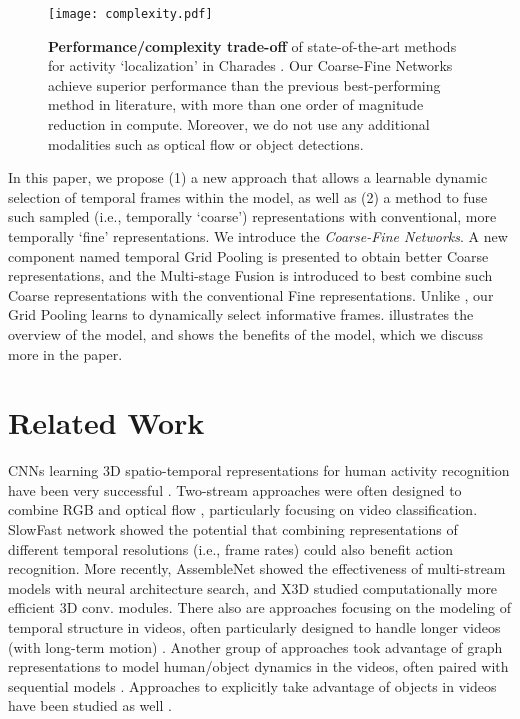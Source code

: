 \documentclass[final]{cvpr}
\begin{document}
\begin{figure}[t]
	\centering
	\texttt{[image: complexity.pdf]}
	\caption{\textbf{Performance/complexity trade-off} of state-of-the-art methods for activity `localization' in Charades \cite{sigurdsson2016hollywood}. Our Coarse-Fine Networks achieve superior performance than the previous best-performing method in literature, with more than one order of magnitude reduction in compute. Moreover, we do not use any additional modalities such as optical flow or object detections.}
	\label{fig:performance_complexity}
	\vspace{-4mm}
\end{figure}

In this paper, we propose (1) a new approach that allows a learnable dynamic selection of temporal frames within the model, as well as (2) a method to fuse such sampled (i.e., temporally `coarse') representations with conventional, more temporally `fine' representations. We introduce the \emph{Coarse-Fine Networks}. A new component named temporal Grid Pooling is presented to obtain better Coarse representations, and the Multi-stage Fusion is introduced to best combine such Coarse representations with the conventional Fine representations. Unlike \cite{feichtenhofer2019slowfast,ryoo2019assemblenet}, our Grid Pooling learns to dynamically select informative frames.
 illustrates the overview of the model, and  shows the benefits of the model, which we discuss more in the paper. \vspace{-2mm}




\section{Related Work}

CNNs learning 3D spatio-temporal representations for human activity recognition have been very successful \cite{tran2014c3d, karpathy2014large,carreira2017quo, tran2017convnet, hara2017learning}. Two-stream approaches were often designed to combine RGB and optical flow \cite{simonyan2014two,feichtenhofer2016convolutional}, particularly focusing on video classification. SlowFast network \cite{feichtenhofer2019slowfast} showed the potential that combining representations of different temporal resolutions (i.e., frame rates) could also benefit action recognition. More recently, AssembleNet \cite{ryoo2019assemblenet} showed the effectiveness of multi-stream models with neural architecture search, and X3D \cite{feichtenhofer2020x3d} studied computationally more efficient 3D conv. modules. There also are approaches focusing on the modeling of temporal structure in videos, often particularly designed to handle longer videos (with long-term motion) \cite{yue2015beyond,varol2017long,lea2017temporal,piergiovanni2018learning,piergiovanni2019temporal}. Another group of approaches took advantage of graph representations to model human/object dynamics in the videos, often paired with sequential models \cite{ghosh2020stacked,mavroudi2020representation,ji2020action}. Approaches to explicitly take advantage of objects in videos have been studied as well \cite{ma2018attend,baradel2018object,zhou2019grounded}.
\end{document}
